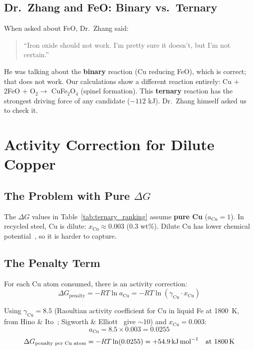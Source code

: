 \documentclass[11pt]{article}
\begin{document}
\subsection{Dr.\ Zhang and FeO: Binary vs.\ Ternary}

When asked about FeO, Dr.\ Zhang said:
\begin{quote}
``Iron oxide should not work. I'm pretty sure it doesn't, but I'm not certain.''
\end{quote}

He was talking about the \textbf{binary} reaction (Cu reducing FeO), which is correct; that does not work. Our calculations show a different reaction entirely: Cu $+$ 2FeO $+$ O$_2 \to$ CuFe$_2$O$_4$ (spinel formation). This \textbf{ternary} reaction has the strongest driving force of any candidate ($-112$ kJ). Dr.\ Zhang himself asked us to check it.


\section{Activity Correction for Dilute Copper}
\label{sec:activity_correction}

\subsection{The Problem with Pure $\Delta G$}

The $\Delta G$ values in Table~\ref{tab:ternary_ranking} assume \textbf{pure Cu} ($a_{\text{Cu}} = 1$). In recycled steel, Cu is dilute: $x_{\text{Cu}} \approx 0.003$ (0.3 wt\%). Dilute Cu has lower chemical potential~\cite{Gaskell2024}, so it is harder to capture.

\subsection{The Penalty Term}

For each Cu atom consumed, there is an activity correction:
\begin{equation}
    \Delta G_{\text{penalty}} = -RT \ln a_{\text{Cu}} = -RT \ln(\gamma_{\text{Cu}} \cdot x_{\text{Cu}})
    \label{eq:penalty}
\end{equation}

Using $\gamma_{\text{Cu}} = 8.5$ (Raoultian activity coefficient for Cu in liquid Fe at \SI{1800}{\kelvin}, from Hino \& Ito~\cite{Hino2010}; Sigworth \& Elliott~\cite{Sigworth1974} give $\sim$10) and $x_{\text{Cu}} = 0.003$:
\[
    a_{\text{Cu}} = 8.5 \times 0.003 = 0.0255
\]
\[
    \Delta G_{\text{penalty per Cu atom}} = -RT \ln(0.0255) = +\SI{54.9}{\kilo\joule\per\mole} \quad \text{at \SI{1800}{\kelvin}}
\]
\end{document}

